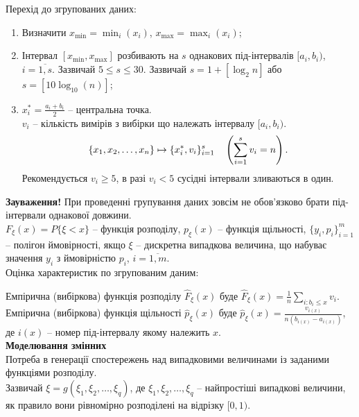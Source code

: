 Перехід до згрупованих даних:
\begin{enumerate}
    \item Визначити $x_{\min} = \min_i (x_i)$, $x_{\max} = \max_i (x_i)$;
    
    \item Інтервал $[x_{\min}, x_{\max}]$ розбивають на $s$ однакових під-інтервалів $[a_i, b_i)$, $i = \overline{1,s}$. Зазвичай $5 \le s \le 30$. Зазвичай $s = 1 + [\log_2 n]$ або $s = [10 \log_{10} (n)]$;
    
    \item $x_i^* = \frac{a_i + b_i}{2}$ -- центральна точка. \\
    
    $v_i$ -- кількість вимірів з вибірки що належать інтервалу $[a_i, b_i)$. \[ \{x_1, x_2, \ldots, x_n\} \mapsto \{x_i^*, v_i\}_{i=1}^s \quad \left( \displaystyle\sum\limits_{i=1}^s v_i = n \right). \] Рекомендується $v_i \ge 5$, в разі $v_i < 5$ сусідні інтервали зливаються в один.
\end{enumerate}

\textbf{Зауваження!} При проведенні групування даних зовсім не обов'язково брати під-інтервали однакової довжини. \\

$F_\xi (x) = P\{ \xi < x\}$ -- функція розподілу, $p_\xi(x)$ -- функція щільності, $\{ y_i, p_i \}_{i=1}^m$ -- полігон ймовірності, якщо $\xi$ -- дискретна випадкова величина, що набуває значення $y_i$ з ймовірністю $p_i$, $i=\overline{1,m}$. \\

Оцінка характеристик по згрупованим даним:

Емпірична (вибіркова) функція розподілу $\widehat{F}_\xi (x)$ буде $\widehat{F}_\xi (x) = \frac{1}{n} \sum_{i: b_i \le x} v_i$. \\

Емпірична (вибіркова) функція щільності $\widehat{p}_\xi (x)$ буде $\widehat{p}_\xi (x) = \frac{v_{i(x)}}{n (b_{i(x)} - a_{i(x)})}$, де $i(x)$ -- номер під-інтервалу якому належить $x$. \\

\textbf{Моделювання змінних} \\

Потреба в генерації спостережень над випадковими величинами із заданими функціями розподілу. \\

Зазвичай $\xi = g(\xi_1, \xi_2, \ldots, \xi_q)$, де $\xi_1, \xi_2, \ldots, \xi_q$ -- найпростіші випадкові величини, як правило вони рівномірно розподілені на відрізку $[0, 1)$. \\

